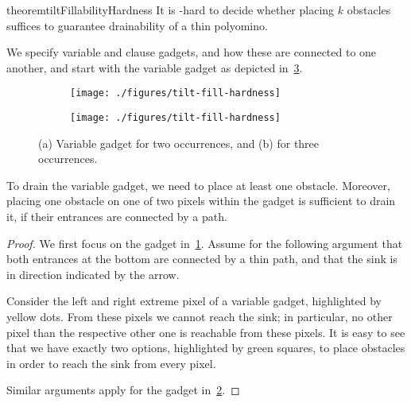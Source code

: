 \documentclass[a4paper,UKenglish,cleveref,thm-restate]{lipics-v2021}
\begin{document}
\begin{restatable}{theorem}{tiltFillabilityHardness}\label{thm:hardness}
	It is \NP-hard to decide whether placing $k$ obstacles suffices to guarantee drainability of a thin polyomino.
\end{restatable}

We specify variable and clause gadgets, and how these are connected to one another, and start with the variable gadget as depicted in~\cref{fig:hardness-variables}.

\begin{figure}[ht]
	\captionsetup[subfigure]{justification=centering}
	\begin{subfigure}[b]{0.43\columnwidth}\centering
		\texttt{[image: ./figures/tilt-fill-hardness]}
		\caption{}
		\label{fig:hardness-variables_a}
	\end{subfigure}\begin{subfigure}[b]{0.57\columnwidth}\centering \texttt{[image: ./figures/tilt-fill-hardness]}\caption{}
		\label{fig:hardness-variables_b}
	\end{subfigure}\caption{(a) Variable gadget for two occurrences, and (b) for three occurrences.}
	\label{fig:hardness-variables}
\end{figure}

\begin{lemma}
	\label{lem:obstacleForVariable}
	To drain the variable gadget, we need to place at least one obstacle.
	Moreover, placing one obstacle on one of two pixels within the gadget is sufficient to drain it, if their entrances are connected by a path.
\end{lemma}


\begin{proof}
	We first focus on the gadget in~\cref{fig:hardness-variables_a}.
	Assume for the following argument that both entrances at the bottom are connected by a thin path, and that the sink is in direction indicated by the arrow.
	
	Consider the left and right extreme pixel of a variable gadget, highlighted by yellow dots.
	From these pixels we cannot reach the sink; in particular, no other pixel than the respective other one is reachable from these pixels.
	It is easy to see that we have exactly two options, highlighted by green squares, to place obstacles in order to reach the sink from every pixel.
	
	Similar arguments apply for the gadget in~\cref{fig:hardness-variables_b}.
\end{proof}
\end{document}
